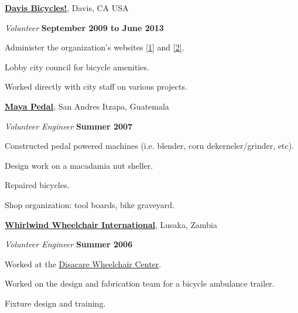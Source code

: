 \documentclass[10pt]{article}
\newenvironment{outerlist}[1][\enskip\textbullet]%
        {\begin{itemize}[#1]}{\end{itemize}%
         \vspace{-.6\baselineskip}}
\newenvironment{innerlist}[1][\enskip\textbullet]%
        {\begin{compactitem}[#1]}{\end{compactitem}}
\newcommand{\blankline}{\quad\pagebreak[2]}
\begin{document}
\begin{innerlist}
\blankline

\href{http://www.davisbicycles.org}{\textbf{Davis Bicycles!}}, Davis, CA USA
\begin{outerlist}
  \item[] \textit{Volunteer}%
    \hfill \textbf{September 2009 to June 2013}
  \begin{innerlist}
    \item Administer the organization's websites
      \href{http://www.davisbicycles.org}{[1]} and
      \href{http://www.bikedavis.info}{[2]}.
    \item Lobby city council for bicycle amenities.
    \item Worked directly with city staff on various projects.
  \end{innerlist}
\end{outerlist}

\blankline

\href{http://www.mayapedal.org/}{\textbf{Maya Pedal}}, San Andres Itzapa, Guatemala
\begin{outerlist}
  \item[] \textit{Volunteer Engineer}%
    \hfill \textbf{Summer 2007}
  \begin{innerlist}
    \item Constructed pedal powered machines (i.e. blender, corn
      dekerneler/grinder, etc).
    \item Design work on a macadamia nut sheller.
    \item Repaired bicycles.
    \item Shop organization: tool boards, bike graveyard.
  \end{innerlist}
\end{outerlist}

\blankline

\href{http://www.whirlwindwheelchair.org/}{\textbf{Whirlwind Wheelchair
International}}, Lusaka, Zambia
\begin{outerlist}
  \item[] \textit{Volunteer Engineer}%
    \hfill \textbf{Summer 2006}
  \begin{innerlist}
    \item Worked at the \href{http://www.disacare.org.zm/}{Disacare Wheelchair
      Center}.
    \item Worked on the design and fabrication team for a bicycle ambulance
      trailer.
    \item Fixture design and training.
  \end{innerlist}
\end{outerlist}


\end{innerlist}
\end{document}
